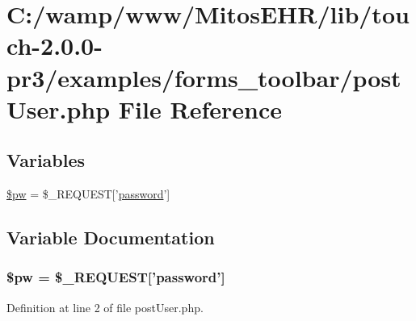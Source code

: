 \hypertarget{toolbar_2post_user_8php}{\section{\-C\-:/wamp/www/\-Mitos\-E\-H\-R/lib/touch-\/2.0.0-\/pr3/examples/forms\-\_\-toolbar/post\-User.php \-File \-Reference}
\label{toolbar_2post_user_8php}
}
\subsection*{\-Variables}
\begin{DoxyCompactItemize}
\item 
\hyperlink{toolbar_2post_user_8php_a4a84bb9d73addd9e90f2f34c36035df4}{\$pw} = \$\-\_\-\-R\-E\-Q\-U\-E\-S\-T\mbox{[}'\hyperlink{classpassword}{password}'\mbox{]}
\end{DoxyCompactItemize}


\subsection{\-Variable \-Documentation}
\hypertarget{toolbar_2post_user_8php_a4a84bb9d73addd9e90f2f34c36035df4}{
\subsubsection[{\$pw}]{\setlength{\rightskip}{0pt plus 5cm}\$pw = \$\-\_\-\-R\-E\-Q\-U\-E\-S\-T\mbox{[}'{\bf password}'\mbox{]}}}\label{toolbar_2post_user_8php_a4a84bb9d73addd9e90f2f34c36035df4}


\-Definition at line 2 of file post\-User.\-php.

